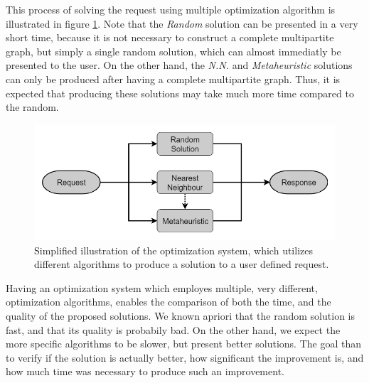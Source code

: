 This process of solving the request using multiple optimization algorithm is illustrated in figure \ref{fig:optimization_system}.
Note that the \textit{Random} solution can be presented in a very short time, 
because it is not necessary to construct a complete multipartite graph, but simply a single random solution,
which can almost immediatly be presented to the user.
On the other hand, the \textit{N.N.} and \textit{Metaheuristic} solutions can only be produced 
after having a complete multipartite graph. Thus, it is expected that producing these solutions 
may take much more time compared to the random. 

\begin{figure}[htpb]
  \centering
  \includegraphics[width=\textwidth]{./Figures/system_design/utility.png}
  \caption{Simplified illustration of the optimization system, which utilizes different algorithms 
  to produce a solution to a user defined request.}
  \label{fig:optimization_system}  
\end{figure}

Having an optimization system which employes multiple, very different, optimization algorithms,
enables the comparison of both the time, and the quality of the proposed solutions.
We known apriori that the random solution is fast, and that its quality is probabily bad.
On the other hand, we expect the more specific algorithms to be slower, but present better solutions.
The goal than to verify if the solution is actually better, how significant the improvement is,
and how much time was necessary to produce such an improvement.

